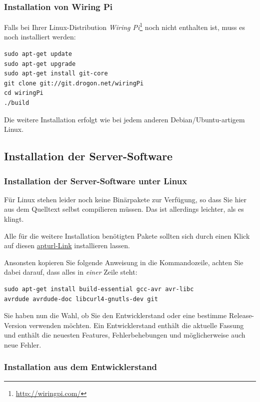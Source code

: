\documentclass[10pt,a4paper]{scrartcl}		%
\begin{document}
\subsubsection*{Installation von Wiring Pi}
Falls bei Ihrer Linux-Distribution \textit{Wiring Pi}\footnote{\url{http://wiringpi.com/}} 
noch nicht enthalten ist, muss es noch installiert werden:

\begin{verbatim}
sudo apt-get update
sudo apt-get upgrade
sudo apt-get install git-core
git clone git://git.drogon.net/wiringPi
cd wiringPi
./build
\end{verbatim}

Die weitere Installation erfolgt wie bei jedem anderen Debian/Ubuntu-artigem Linux.

\subsection{Installation der Server-Software}
\label{serverinst}
\subsubsection{Installation der Server-Software unter Linux}
Für Linux stehen leider noch keine Binärpakete zur Verfügung,
so dass Sie hier aus dem Quelltext selbst compilieren müssen.
Das ist allerdings leichter, als es klingt.

Alle für die weitere Installation benötigten Pakete sollten
sich durch einen Klick auf diesen 
\href{apt://build-essential,gcc-avr,avr-libc,avrdude,avrdude-doc,libcurl4-gnutls-dev,git}{apturl-Link} installieren lassen.

Ansonsten kopieren Sie folgende Anweisung in die Kommandozeile, 
achten Sie dabei darauf, dass alles in \textit{einer} Zeile steht:

\begin{verbatim}
sudo apt-get install build-essential gcc-avr avr-libc 
avrdude avrdude-doc libcurl4-gnutls-dev git
\end{verbatim}

Sie haben nun die Wahl, ob Sie den Entwicklerstand oder eine
bestimme Release-Version verwenden möchten. Ein Entwicklerstand
enthält die aktuelle Fassung und enthält die neuesten Features,
Fehlerbehebungen und möglicherweise auch neue Fehler.

\subsubsection*{Installation aus dem Entwicklerstand}
\end{document}
